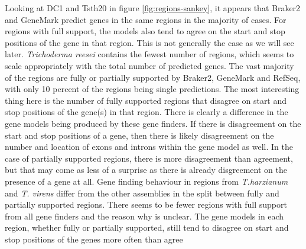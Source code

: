 Looking at DC1 and Tsth20 in figure \ref{fig:regions-sankey}, it
appears that Braker2 and GeneMark predict genes in the same regions in
the majority of cases. For regions with full support, the models also
tend to agree on the start and stop positions of the gene in that
region. This is not generally the case as we will see
later. \textit{Trichoderma reesei} contains the fewest number of
regions, which seems to scale appropriately with the total number of
predicted genes. The vast majority of the regions are fully or
partially supported by Braker2, GeneMark and RefSeq, with only 10
percent of the regions being single predictions. The most interesting
thing here is the number of fully supported regions that disagree on
start and stop positions of the gene(s) in that region. There is
clearly a difference in the gene models being produced by these gene
finders. If there is disagreement on the start and stop positions of a
gene, then there is likely disagreement on the number and location of
exons and introns within the gene model as well. In the case of
partially supported regions, there is more disagreement than
agreement, but that may come as less of a surprise as there is already
disgreement on the presence of a gene at all. Gene finding behaviour
in regions from \textit{T.harzianum} and \textit{T. virens} differ
from the other assemblies in the split between fully and partially
supported regions. There seems to be fewer regions with full support
from all gene finders and the reason why is unclear. The gene models
in each region, whether fully or partially supported, still tend to
disagree on start and stop positions of the genes more often than
agree
